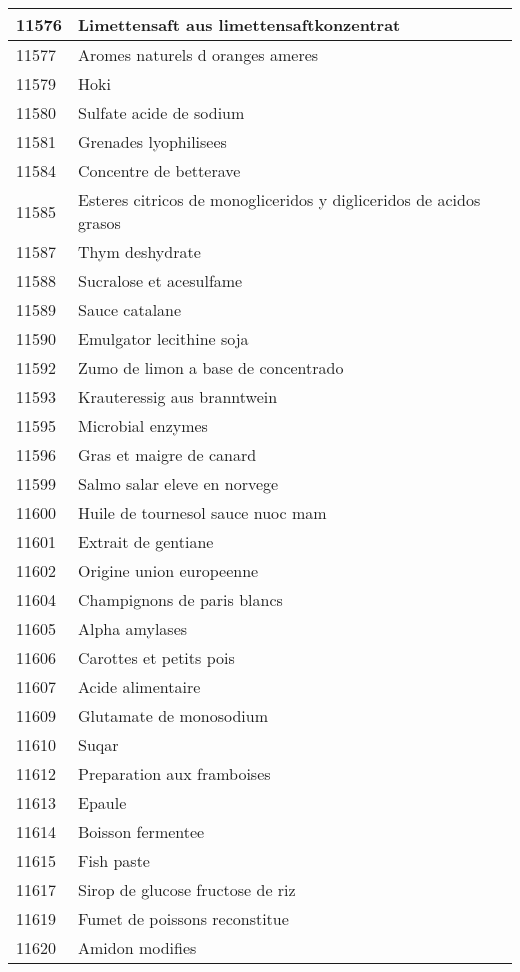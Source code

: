 \begin{longtable}{|l|l|}
11576 & Limettensaft aus limettensaftkonzentrat \\ \hline 
11577 & Aromes naturels d oranges ameres \\ \hline 
11579 & Hoki \\ \hline 
11580 & Sulfate acide de sodium \\ \hline 
11581 & Grenades lyophilisees \\ \hline 
11584 & Concentre de betterave \\ \hline 
11585 & Esteres citricos de monogliceridos y digliceridos de acidos grasos \\ \hline 
11587 & Thym deshydrate \\ \hline 
11588 & Sucralose et acesulfame \\ \hline 
11589 & Sauce catalane \\ \hline 
11590 & Emulgator lecithine soja \\ \hline 
11592 & Zumo de limon a base de concentrado \\ \hline 
11593 & Krauteressig aus branntwein \\ \hline 
11595 & Microbial enzymes \\ \hline 
11596 & Gras et maigre de canard \\ \hline 
11599 & Salmo salar eleve en norvege \\ \hline 
11600 & Huile de tournesol sauce nuoc mam \\ \hline 
11601 & Extrait de gentiane \\ \hline 
11602 & Origine union europeenne \\ \hline 
11604 & Champignons de paris blancs \\ \hline 
11605 & Alpha amylases \\ \hline 
11606 & Carottes et petits pois \\ \hline 
11607 & Acide alimentaire \\ \hline 
11609 & Glutamate de monosodium \\ \hline 
11610 & Suqar \\ \hline 
11612 & Preparation aux framboises \\ \hline 
11613 & Epaule \\ \hline 
11614 & Boisson fermentee \\ \hline 
11615 & Fish paste \\ \hline 
11617 & Sirop de glucose fructose de riz \\ \hline 
11619 & Fumet de poissons reconstitue \\ \hline 
11620 & Amidon modifies \\ \hline 

\end{longtable}
